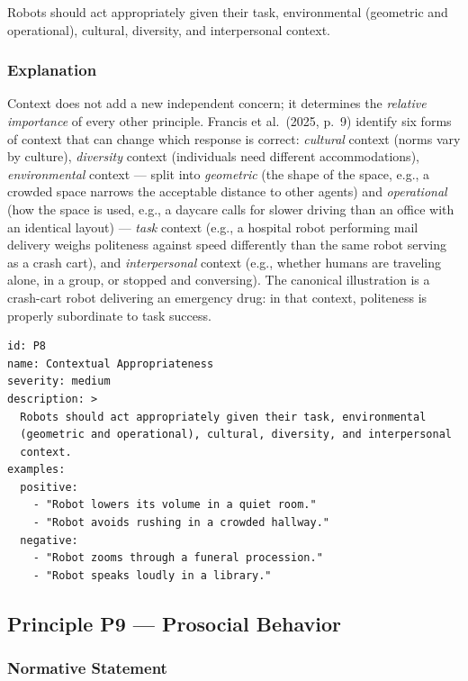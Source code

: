 \documentclass[utf8]{frontiers_suppmat} %
\begin{document}
Robots should act appropriately given their task, environmental
(geometric and operational), cultural, diversity, and interpersonal
context.

\subsubsection{Explanation}\label{explanation-8}

Context does not add a new independent concern; it determines the
\emph{relative importance} of every other principle. Francis et
al.~(2025, p.~9) identify six forms of context that can change which
response is correct: \emph{cultural} context (norms vary by culture),
\emph{diversity} context (individuals need different accommodations),
\emph{environmental} context --- split into \emph{geometric} (the shape
of the space, e.g., a crowded space narrows the acceptable distance to
other agents) and \emph{operational} (how the space is used, e.g., a
daycare calls for slower driving than an office with an identical
layout) --- \emph{task} context (e.g., a hospital robot performing mail
delivery weighs politeness against speed differently than the same robot
serving as a crash cart), and \emph{interpersonal} context (e.g.,
whether humans are traveling alone, in a group, or stopped and
conversing). The canonical illustration is a crash-cart robot delivering
an emergency drug: in that context, politeness is properly subordinate
to task success.

\begin{lstlisting}[style=literatecard]
id: P8
name: Contextual Appropriateness
severity: medium
description: >
  Robots should act appropriately given their task, environmental
  (geometric and operational), cultural, diversity, and interpersonal
  context.
examples:
  positive:
    - "Robot lowers its volume in a quiet room."
    - "Robot avoids rushing in a crowded hallway."
  negative:
    - "Robot zooms through a funeral procession."
    - "Robot speaks loudly in a library."
\end{lstlisting}

\subsection{Principle P9 --- Prosocial
Behavior}\label{principle-p9-prosocial-behavior}

\subsubsection{Normative Statement}\label{normative-statement-9}
\end{document}
